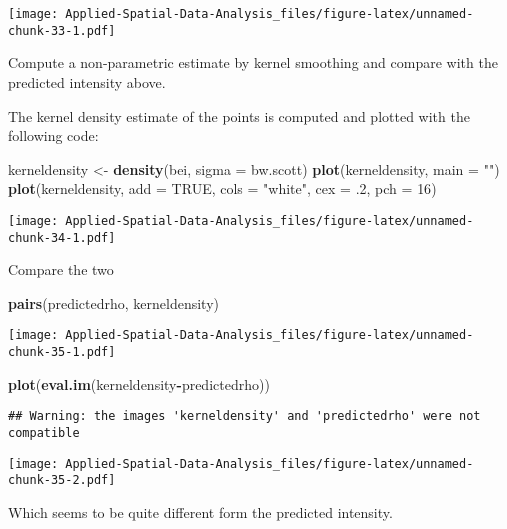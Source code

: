 \documentclass[
]{book}
\newenvironment{Shaded}{\begin{snugshade}}{\end{snugshade}}
\newcommand{\DataTypeTok}[1]{\textcolor[rgb]{0.13,0.29,0.53}{#1}}
\newcommand{\DecValTok}[1]{\textcolor[rgb]{0.00,0.00,0.81}{#1}}
\newcommand{\FloatTok}[1]{\textcolor[rgb]{0.00,0.00,0.81}{#1}}
\newcommand{\KeywordTok}[1]{\textcolor[rgb]{0.13,0.29,0.53}{\textbf{#1}}}
\newcommand{\NormalTok}[1]{#1}
\newcommand{\OperatorTok}[1]{\textcolor[rgb]{0.81,0.36,0.00}{\textbf{#1}}}
\newcommand{\OtherTok}[1]{\textcolor[rgb]{0.56,0.35,0.01}{#1}}
\newcommand{\StringTok}[1]{\textcolor[rgb]{0.31,0.60,0.02}{#1}}
\begin{document}
\texttt{[image: Applied-Spatial-Data-Analysis\_files/figure-latex/unnamed-chunk-33-1.pdf]}

Compute a non-parametric estimate by kernel smoothing and compare with the predicted intensity above.

The kernel density estimate of the points is computed and plotted with the following code:

\begin{Shaded}
\begin{Highlighting}[]
\NormalTok{kerneldensity <-}\StringTok{ }\KeywordTok{density}\NormalTok{(bei, }\DataTypeTok{sigma =}\NormalTok{ bw.scott)}
\KeywordTok{plot}\NormalTok{(kerneldensity, }\DataTypeTok{main =} \StringTok{""}\NormalTok{)}
\KeywordTok{plot}\NormalTok{(kerneldensity, }\DataTypeTok{add =} \OtherTok{TRUE}\NormalTok{, }\DataTypeTok{cols =} \StringTok{"white"}\NormalTok{, }\DataTypeTok{cex =} \FloatTok{.2}\NormalTok{, }\DataTypeTok{pch =} \DecValTok{16}\NormalTok{)}
\end{Highlighting}
\end{Shaded}

\texttt{[image: Applied-Spatial-Data-Analysis\_files/figure-latex/unnamed-chunk-34-1.pdf]}

Compare the two

\begin{Shaded}
\begin{Highlighting}[]
\KeywordTok{pairs}\NormalTok{(predictedrho, kerneldensity)}
\end{Highlighting}
\end{Shaded}

\texttt{[image: Applied-Spatial-Data-Analysis\_files/figure-latex/unnamed-chunk-35-1.pdf]}

\begin{Shaded}
\begin{Highlighting}[]
\KeywordTok{plot}\NormalTok{(}\KeywordTok{eval.im}\NormalTok{(kerneldensity}\OperatorTok{-}\NormalTok{predictedrho))}
\end{Highlighting}
\end{Shaded}

\begin{verbatim}
## Warning: the images 'kerneldensity' and 'predictedrho' were not compatible
\end{verbatim}

\texttt{[image: Applied-Spatial-Data-Analysis\_files/figure-latex/unnamed-chunk-35-2.pdf]}

Which seems to be quite different form the predicted intensity.
\end{document}
